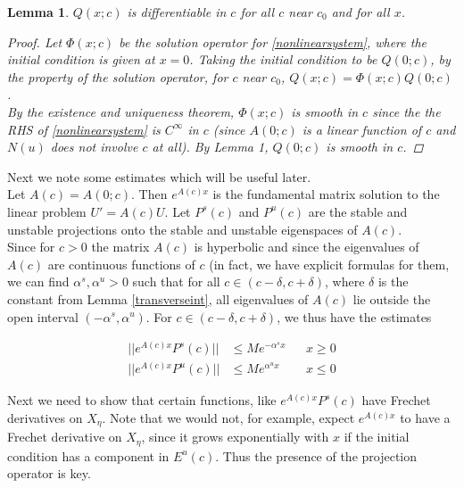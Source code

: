 \documentclass[12pt]{article}
\newtheorem{lemma}{Lemma}
\begin{document}
\begin{lemma}\label{qcexists}
$Q(x; c)$ is differentiable in $c$ for all $c$ near $c_0$ and for all $x$. 
\begin{proof}
Let $\Phi(x; c)$ be the solution operator for \eqref{nonlinearsystem}, where the initial condition is given at $x = 0$. Taking the initial condition to be $Q(0; c)$, by the property of the solution operator, for $c$ near $c_0$, $Q(x; c) = \Phi(x; c)Q(0; c)$.\\

By the existence and uniqueness theorem, $\Phi(x; c)$ is smooth in $c$ since the the RHS of \eqref{nonlinearsystem} is $C^\infty$ in $c$ (since $A(0; c)$ is a linear function of $c$ and $N(u)$ does not involve $c$ at all). By Lemma 1, $Q(0; c)$ is smooth in $c$.
\end{proof}
\end{lemma}

Next we note some estimates which will be useful later.\\

Let $A(c) = A(0; c)$. Then $e^{A(c)x}$ is the fundamental matrix solution to the linear problem $U' = A(c) U$. Let $P^s(c)$ and $P^u(c)$ are the stable and unstable projections onto the stable and unstable eigenspaces of $A(c)$.\\

Since for $c > 0$ the matrix $A(c)$ is hyperbolic and since the eigenvalues of $A(c)$ are continuous functions of $c$ (in fact, we have explicit formulas for them, we can find $\alpha^s, \alpha^u > 0$ such that for all $c \in (c - \delta, c + \delta)$, where $\delta$ is the constant from Lemma \ref{transverseint}, all eigenvalues of $A(c)$ lie outside the open interval $(-\alpha^s, \alpha^u)$. For $c \in (c - \delta, c + \delta)$, we thus have the estimates

\begin{align*}
||e^{A(c)x}P^s(c)|| &\leq Me^{-\alpha^s x} && x \geq 0\\
||e^{A(c)x}P^u(c)|| &\leq Me^{\alpha^u x} && x \leq 0
\end{align*}

Next we need to show that certain functions, like $e^{A(c)x} P^s(c)$ have Frechet derivatives on $X_\eta$. Note that we would not, for example, expect $e^{A(c)x}$ to have a Frechet derivative on $X_\eta$, since it grows exponentially with $x$ if the initial condition has a component in $E^u(c)$. Thus the presence of the projection operator is key.\\
\end{document}
